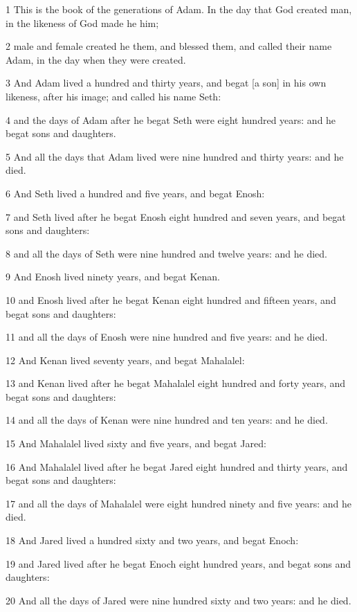 \par 1 This is the book of the generations of Adam. In the day that God created man, in the likeness of God made he him;
\par 2 male and female created he them, and blessed them, and called their name Adam, in the day when they were created.
\par 3 And Adam lived a hundred and thirty years, and begat [a son] in his own likeness, after his image; and called his name Seth:
\par 4 and the days of Adam after he begat Seth were eight hundred years: and he begat sons and daughters.
\par 5 And all the days that Adam lived were nine hundred and thirty years: and he died.
\par 6 And Seth lived a hundred and five years, and begat Enosh:
\par 7 and Seth lived after he begat Enosh eight hundred and seven years, and begat sons and daughters:
\par 8 and all the days of Seth were nine hundred and twelve years: and he died.
\par 9 And Enosh lived ninety years, and begat Kenan.
\par 10 and Enosh lived after he begat Kenan eight hundred and fifteen years, and begat sons and daughters:
\par 11 and all the days of Enosh were nine hundred and five years: and he died.
\par 12 And Kenan lived seventy years, and begat Mahalalel:
\par 13 and Kenan lived after he begat Mahalalel eight hundred and forty years, and begat sons and daughters:
\par 14 and all the days of Kenan were nine hundred and ten years: and he died.
\par 15 And Mahalalel lived sixty and five years, and begat Jared:
\par 16 And Mahalalel lived after he begat Jared eight hundred and thirty years, and begat sons and daughters:
\par 17 and all the days of Mahalalel were eight hundred ninety and five years: and he died.
\par 18 And Jared lived a hundred sixty and two years, and begat Enoch:
\par 19 and Jared lived after he begat Enoch eight hundred years, and begat sons and daughters:
\par 20 And all the days of Jared were nine hundred sixty and two years: and he died.

